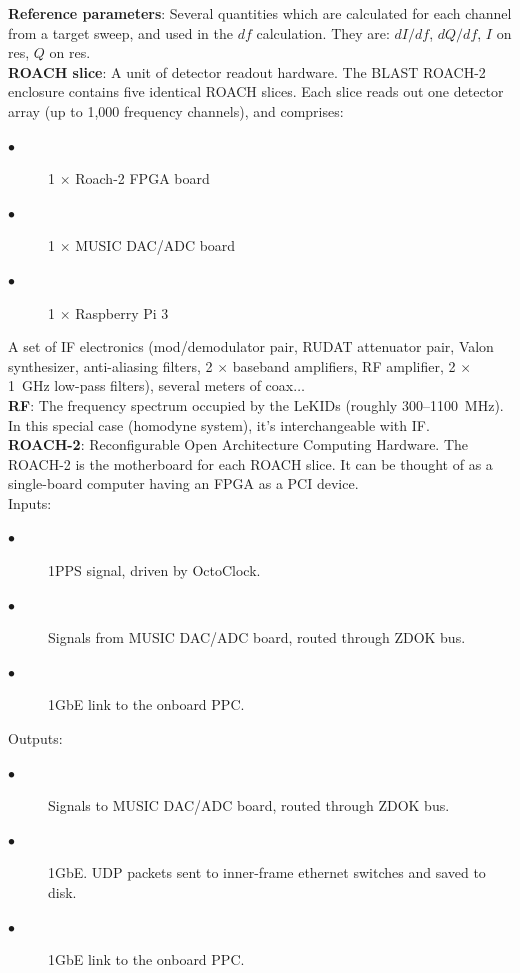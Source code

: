 \textbf{Reference parameters}: Several quantities which are calculated for each channel from a target sweep, and used in the $df$ calculation. They are: $dI/df$, $dQ/df$, $I$ on res, $Q$ on res.\\
\textbf{ROACH slice}: A unit of detector readout hardware. The BLAST ROACH-2 enclosure contains five identical ROACH slices. Each slice reads out one detector array (up to 1,000 frequency channels), and comprises:
\begin{description}
  \item[$\bullet$] 1 $\times$ Roach-2 FPGA board
  \item[$\bullet$] 1 $\times$ MUSIC DAC/ADC board
  \item[$\bullet$] 1 $\times$ Raspberry Pi 3
\end{description}
A set of IF electronics (mod/demodulator pair, RUDAT attenuator pair, Valon synthesizer, anti-aliasing filters, 2 $\times$ baseband amplifiers, RF amplifier, 2 $\times$ 1~GHz low-pass filters), several meters of coax$\ldots$ \\
\textbf{RF}: The frequency spectrum occupied by the LeKIDs (roughly 300--1100~MHz). In this special case (homodyne system), it’s interchangeable with IF.\\
\textbf{ROACH-2}: Reconfigurable Open Architecture Computing Hardware. The ROACH-2 is the motherboard for each ROACH slice. It can be thought of as a single-board computer having an FPGA as a PCI device.\\
Inputs:
\begin{description}
  \item[$\bullet$] 1PPS signal, driven by OctoClock.
  \item[$\bullet$] Signals from MUSIC DAC/ADC board, routed through ZDOK bus.
  \item[$\bullet$] 1GbE link to the onboard PPC\@.
\end{description}
Outputs:
\begin{description}
  \item[$\bullet$] Signals to MUSIC DAC/ADC board, routed through ZDOK bus.
  \item[$\bullet$] 1GbE. UDP packets sent to inner-frame ethernet switches and saved to disk.
  \item[$\bullet$] 1GbE link to the onboard PPC\@.
\end{description}
